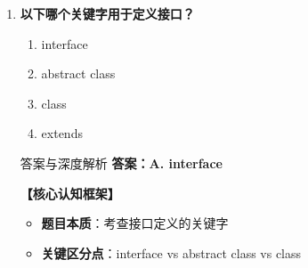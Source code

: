 \documentclass[12pt, a4paper]{ctexart}
\begin{document}
\begin{enumerate}[label=\textbf{\arabic*.}]
\begin{bluebox}{答案与深度解析}
		      \textbf{考场秒杀三步法}：
		      \begin{enumerate}[label={}, nosep]
			      \item 看到"必须所有"→警惕（可能是陷阱）
			      \item 区分"抽象子类"和"具体子类"
			      \item 子类是abstract→可不实现
		      \end{enumerate}

		      \textbf{记忆口诀}：
		      \begin{itemize}[label={}, nosep]
			      \item 抽象类不能new，方法可有也有无
			      \item 抽象子类可延后，具体子类要全做
		      \end{itemize}

		      \textbf{高频陷阱}：
		      \begin{enumerate}[label={}, nosep]
			      \item 误认为"所有子类必须实现所有抽象方法"
			      \item 忽略抽象子类可不实现的事实
			      \item 混淆"实例化"和"作为类型引用"
		      \end{enumerate}

		      \textbf{5秒决策技巧}：看到"子类必须实现所有抽象方法"→错误（抽象子类例外）
	      \end{bluebox}

	      \vspace{1em}

	\item \textbf{以下哪个关键字用于定义接口？}
	      \begin{enumerate}[label=\Alph*.]
		      \item interface
		      \item abstract class
		      \item class
		      \item extends
	      \end{enumerate}

	      \begin{bluebox}{答案与深度解析}
		      \textbf{答案：A. interface}

		      \textbf{【核心认知框架】}
		      \begin{itemize}[label={}, leftmargin=*, nosep]
			      \item \textbf{题目本质}：考查接口定义的关键字
			      \item \textbf{关键区分点}：interface vs abstract class vs class
		      \end{itemize}


\end{bluebox}
\end{enumerate}
\end{document}
